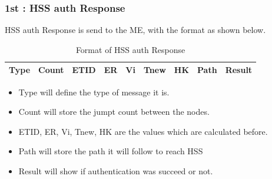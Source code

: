 {\begin{itemize}
{            \subsubsection*{1st : HSS auth Response}{
                HSS auth Response is send to the ME, with the format as shown below.
                \begin{table}[h]
                    \centering
                    \begin{tabular}{|c|c|c|c|c|c|c|c|c|}
                        \hline
                        Type & Count & ETID & ER & Vi & Tnew & HK & Path & Result\\
                        \hline
                    \end{tabular}
                    \caption{Format of HSS auth Response}
                \end{table}
                \begin{itemize}
                    \item Type will define the type of message it is.
                    \item Count will store the jumpt count between the nodes.
                    \item ETID, ER, Vi, Tnew, HK are the values which are calculated before.
                    \item Path will store the path it will follow to reach HSS
                    \item Result will show if authentication was succeed or not.
                \end{itemize}
            }
}
\end{itemize}}
